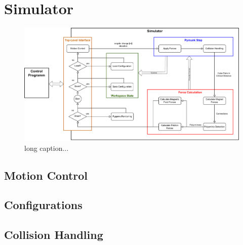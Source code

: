 \chapter{Simulator}
\label{chap:sim}

\begin{figure}
	\centering
	\includegraphics[width=1\textwidth]{figures/simulator_controlflow.pdf}
	\caption[Control flow of the simulator]{long caption...}
	\label{fig:simulator}
\end{figure}




\section{Motion Control}


\section{Configurations}


\section{Collision Handling}



